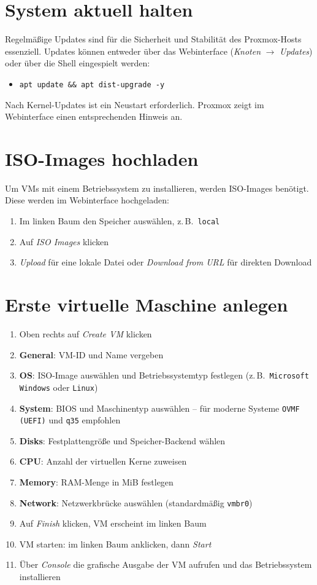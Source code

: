 \documentclass[11pt, oneside, numbers=noenddot]{scrbook}
\begin{document}
\section{System aktuell halten}
Regelmäßige Updates sind für die Sicherheit und Stabilität des Proxmox-Hosts essenziell. Updates können entweder über das Webinterface (\textit{Knoten} $\rightarrow$ \textit{Updates}) oder über die Shell eingespielt werden:
\begin{itemize}
  \item \texttt{apt update \&\& apt dist-upgrade -y}
\end{itemize}

Nach Kernel-Updates ist ein Neustart erforderlich. Proxmox zeigt im Webinterface einen entsprechenden Hinweis an.

\section{ISO-Images hochladen}
Um VMs mit einem Betriebssystem zu installieren, werden ISO-Images benötigt. Diese werden im Webinterface hochgeladen:

\begin{enumerate}
  \item Im linken Baum den Speicher auswählen, z.\,B.\ \texttt{local}
  \item Auf \textit{ISO Images} klicken
  \item \textit{Upload} für eine lokale Datei oder \textit{Download from URL} für direkten Download
\end{enumerate}

\section{Erste virtuelle Maschine anlegen}
\begin{enumerate}
  \item Oben rechts auf \textit{Create VM} klicken
  \item \textbf{General}: VM-ID und Name vergeben
  \item \textbf{OS}: ISO-Image auswählen und Betriebssystemtyp festlegen (z.\,B.\ \texttt{Microsoft Windows} oder \texttt{Linux})
  \item \textbf{System}: BIOS und Maschinentyp auswählen -- für moderne Systeme \texttt{OVMF (UEFI)} und \texttt{q35} empfohlen
  \item \textbf{Disks}: Festplattengröße und Speicher-Backend wählen
  \item \textbf{CPU}: Anzahl der virtuellen Kerne zuweisen
  \item \textbf{Memory}: RAM-Menge in MiB festlegen
  \item \textbf{Network}: Netzwerkbrücke auswählen (standardmäßig \texttt{vmbr0})
  \item Auf \textit{Finish} klicken, VM erscheint im linken Baum
  \item VM starten: im linken Baum anklicken, dann \textit{Start}
  \item Über \textit{Console} die grafische Ausgabe der VM aufrufen und das Betriebssystem installieren
\end{enumerate}
\end{document}
